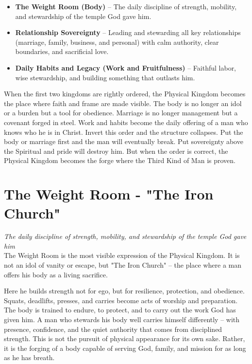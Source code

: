 \documentclass[12pt,a4paper]{book}
\begin{document}
\begin{itemize}

\item \textbf{The Weight Room (Body)} -- The daily discipline of strength, mobility, and stewardship of the temple God gave him.
\item \textbf{Relationship Sovereignty} -- Leading and stewarding all key relationships (marriage,  family,  business,  and personal) with calm authority, clear boundaries, and sacrificial love.
\item \textbf{Daily Habits and Legacy (Work and Fruitfulness)} -- Faithful labor, wise stewardship, and building something that outlasts him.

\end{itemize}

When the first two kingdoms are rightly ordered, the Physical Kingdom becomes the place where faith and frame are made visible. The body is no longer an idol or a burden but a tool for obedience. Marriage is no longer management but a covenant forged in steel. Work and habits become the daily offering of a man who knows who he is in Christ. Invert this order and the structure collapses. Put the body or marriage first and the man will eventually break. Put sovereignty above the Spiritual and pride will destroy him. But when the order is correct, the Physical Kingdom becomes the forge where the Third Kind of Man is proven.

\section{The Weight Room - "The Iron Church"}

\textit{The daily discipline of strength, mobility, and stewardship of the temple God gave him} \\

The Weight Room is the most visible expression of the Physical Kingdom.   It is not an idol of vanity or escape,  but "The Iron Church" -- the place where a man offers his body as a living sacrifice. 

Here he builds strength not for ego, but for resilience, protection, and obedience.   Squats,  deadlifts,  presses,  and carries become acts of worship and preparation. The body is trained to endure,  to protect,  and to carry out the work God has given him.  A man who stewards his body well carries himself differently -- with presence,  confidence,  and the quiet authority that comes from disciplined strength. This is not the pursuit of physical appearance for its own sake.  Rather,  it is the forging of a body capable of serving God,  family,  and mission for as long as he has breath.
\end{document}
